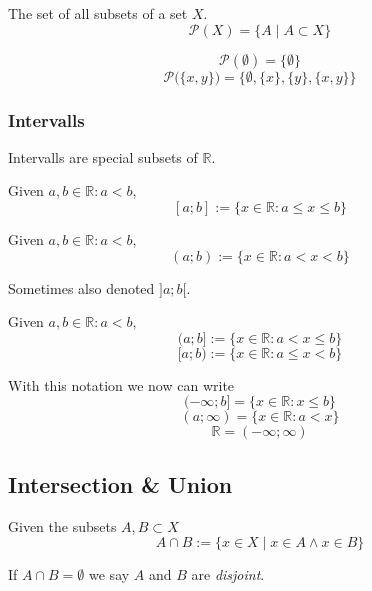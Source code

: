 \begin{definition}[Powerset]
   The set of all subsets of a set \(X\).
   \[\mathcal{P}(X) = \{A \mid A \subset X\}\]
\end{definition}
\begin{example}
   \[\mathcal{P}(\emptyset) = \{\emptyset\}\]
   \[\mathcal{P}\big(\{x, y\}\big) = \big\{\emptyset, \{x\}, \{y\}, \{x, y\}\big\}\]
\end{example}

\subsubsection{Intervalls}
Intervalls are special subsets of \(\mathbb{R}\).

\begin{definition}
   Given \(a, b \in \mathbb{R}: a < b\),
   \[[a; b] := \{x \in \mathbb{R}: a \leq x \leq b\}\]
\end{definition}

\begin{definition}
   Given \(a, b \in \mathbb{R}: a < b\),
   \[(a; b) := \{x \in \mathbb{R}: a < x < b\}\]
\end{definition}
\begin{remark}[Notation]
   Sometimes also denoted \(]a;b[\).
\end{remark}

\begin{definition}
   Given \(a, b \in \mathbb{R}: a < b\),
   \[(a; b] := \{x \in \mathbb{R}: a < x \leq b\}\]
   \[[a; b) := \{x \in \mathbb{R}: a \leq x < b\}\]
\end{definition}
\begin{remark}[Intuition]
   With this notation we now can write
   \[(-\infty; b] = \{x \in \mathbb{R}: x \leq b\}\]
   \[(a; \infty) = \{x \in \mathbb{R}: a < x\}\]
   \[\mathbb{R} = (-\infty; \infty)\]
\end{remark}

\subsection{Intersection \& Union}
\begin{definition}[Intersection]
   Given the subsets \(A, B \subset X\)
   \[A \cap B := \{x \in X \mid x \in A \land x \in B\}\]
\end{definition}
\begin{remark}
   If \(A \cap B = \emptyset\) we say \(A\) and \(B\) are \textit{disjoint}.
\end{remark}

